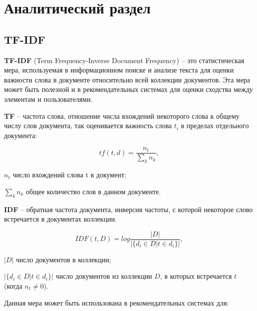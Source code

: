 \section{Аналитический раздел}

\subsection{TF-IDF}

\textbf{TF-IDF} (Term Frequency-Inverse Document Frequency) -- это статистическая мера, используемая в информационном поиске и анализе текста для оценки важности слова в документе относительно всей коллекции документов. Эта мера может быть полезной и в рекомендательных системах для оценки сходства между элементам и пользователями. \cite{tfidf}

\textbf{TF} -- частота слова, отношение числа вхождений некоторого слова к общему числу слов документа, так оценивается важность слова $t_i$ в пределах отдельного документа:

\begin{equation}
	tf(t, d) = \frac{n_t}{\sum_{k}{n_k}},
\end{equation}
\begin{eqexpl}[15mm]
\item{$n_t$} число вхождений слова t в документ;
\item{$\sum_{k}{n_k}$} общее количество слов в данном документе.
\end{eqexpl}

\textbf{IDF} -- обратная частота документа, инверсия частоты, с которой некоторое слово встречается в документах коллекции.

\begin{equation}
	IDF(t, D) = log \frac{|D|}{|\{d_i \in D | t \in d_i\}|},
\end{equation}
\begin{eqexpl}[15mm]
\item{$|D|$} число документов в коллекции;
\item{$|\{d_i \in D | t \in d_i\}|$} число документов из коллекции $D$, в которых встречается $t$ (когда $n_t \neq 0$).
\end{eqexpl}

Данная мера может быть использована в рекомендательных системах для:

